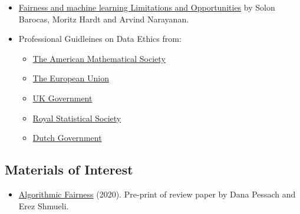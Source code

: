 \documentclass[
  12pt,
]{book}
\providecommand{\tightlist}{%
  \setlength{\itemsep}{0pt}\setlength{\parskip}{0pt}}
\begin{document}
\begin{itemize}
\item
  \href{https://fairmlbook.org/}{Fairness and machine learning
  Limitations and Opportunities} by Solon Barocas, Moritz Hardt and Arvind Narayanan.
\item
  Professional Guidleines on Data Ethics from:

  \begin{itemize}
  \tightlist
  \item
    \href{http://www.ams.org/about-us/governance/policy-statements/sec-ethics}{The American Mathematical Society}
  \item
    \href{https://op.europa.eu/s/sUPP}{The European Union}
  \item
    \href{https://www.gov.uk/guidance/understanding-artificial-intelligence-ethics-and-safety}{UK Government}
  \item
    \href{https://rss.org.uk/RSS/media/News-and-publications/Publications/Reports\%20and\%20guides/A-Guide-for-Ethical-Data-Science-Final-Oct-2019.pdf}{Royal Statistical Society}
  \item
    \href{https://www.government.nl/documents/reports/2021/07/31/impact-assessment-fundamental-rights-and-algorithms}{Dutch Government}
  \end{itemize}
\end{itemize}

\hypertarget{materials-of-interest-4}{%
\subsection*{Materials of Interest}\label{materials-of-interest-4}}

\begin{itemize}
\tightlist
\item
  \href{https://arxiv.org/abs/2001.09784}{Algorithmic Fairness} (2020). Pre-print of review paper by Dana Pessach and Erez Shmueli.
\end{itemize}

  
\end{document}
